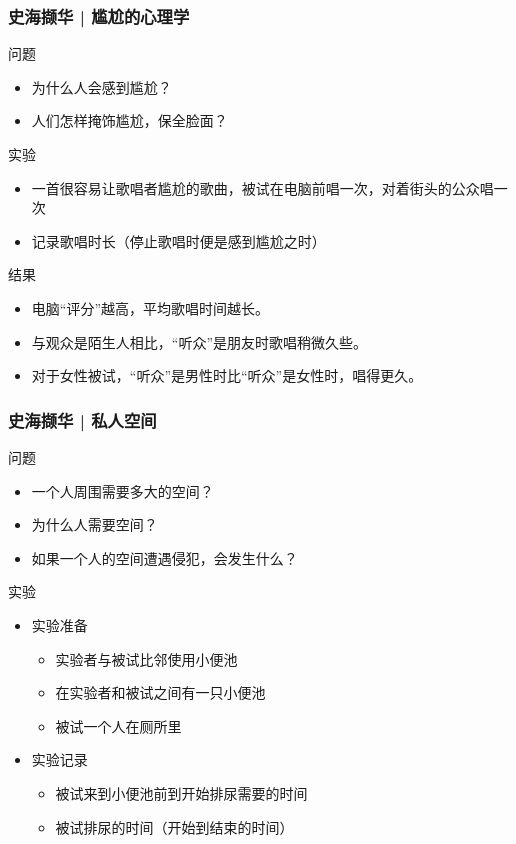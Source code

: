 \begin{frame}
  \frametitle{史海撷华 | 尴尬的心理学}
  \begin{block}{问题}
    \begin{itemize}
      \item 为什么人会感到尴尬？
      \item 人们怎样掩饰尴尬，保全脸面？
    \end{itemize}
  \end{block}
  \pause
  \begin{block}{实验}
    \begin{itemize}
      \item 一首很容易让歌唱者尴尬的歌曲，被试在电脑前唱一次，对着街头的公众唱一次
      \item 记录歌唱时长（停止歌唱时便是感到尴尬之时）
    \end{itemize}
  \end{block}
  \pause
  \begin{block}{结果}
    \begin{itemize}
      \item 电脑“评分”越高，平均歌唱时间越长。
      \item 与观众是陌生人相比，“听众”是朋友时歌唱稍微久些。
      \item 对于女性被试，“听众”是男性时比“听众”是女性时，唱得更久。
    \end{itemize}
  \end{block}
\end{frame}

\begin{frame}
  \frametitle{史海撷华 | 私人空间}
  \begin{block}{问题}
    \begin{itemize}
      \item 一个人周围需要多大的空间？
      \item 为什么人需要空间？
      \item 如果一个人的空间遭遇侵犯，会发生什么？
    \end{itemize}
  \end{block}
  \pause
  \begin{block}{实验}
    \begin{itemize}
      \item 实验准备
        \begin{itemize}
          \item 实验者与被试比邻使用小便池
          \item 在实验者和被试之间有一只小便池
          \item 被试一个人在厕所里
        \end{itemize}
      \item 实验记录
        \begin{itemize}
          \item 被试来到小便池前到开始排尿需要的时间
          \item 被试排尿的时间（开始到结束的时间）
        \end{itemize}
    \end{itemize}
  \end{block}
\end{frame}

